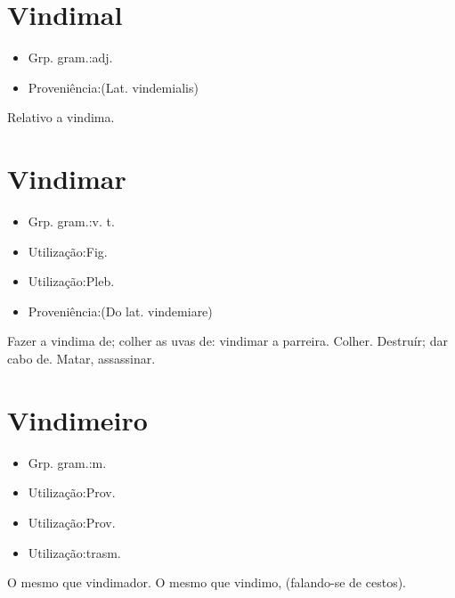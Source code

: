 \documentclass{article}
\begin{document}
\section{Vindimal}
\begin{itemize}
\item {Grp. gram.:adj.}
\end{itemize}
\begin{itemize}
\item {Proveniência:(Lat. \textunderscore vindemialis\textunderscore )}
\end{itemize}
Relativo a vindima.
\section{Vindimar}
\begin{itemize}
\item {Grp. gram.:v. t.}
\end{itemize}
\begin{itemize}
\item {Utilização:Fig.}
\end{itemize}
\begin{itemize}
\item {Utilização:Pleb.}
\end{itemize}
\begin{itemize}
\item {Proveniência:(Do lat. \textunderscore vindemiare\textunderscore )}
\end{itemize}
Fazer a vindima de; colher as uvas de: \textunderscore vindimar a parreira\textunderscore .
Colher.
Destruír; dar cabo de.
Matar, assassinar.
\section{Vindimeiro}
\begin{itemize}
\item {Grp. gram.:m.}
\end{itemize}
\begin{itemize}
\item {Utilização:Prov.}
\end{itemize}
\begin{itemize}
\item {Utilização:Prov.}
\end{itemize}
\begin{itemize}
\item {Utilização:trasm.}
\end{itemize}
O mesmo que \textunderscore vindimador\textunderscore .
O mesmo que \textunderscore vindimo\textunderscore , (falando-se de cestos).
\end{document}
